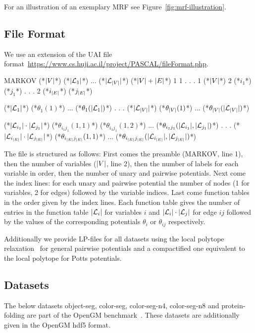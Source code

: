 For an illustration of an exemplary MRF see Figure~\ref{fig:mrf-illustration}.

\subsection{File Format}
\label{sec:mrf-file-format}
We use an extension of the UAI file format~\url{https://www.cs.huji.ac.il/project/PASCAL/fileFormat.php}.

{
\small
\begin{fileformat}
MARKOV
(*$\lvert V\rvert$*)
(*$\lvert\mathcal{L}_1\rvert$*) ... (*$\lvert\mathcal{L}_{\lvert V\rvert}\rvert$*) 
(*$\lvert V\rvert + \lvert E\rvert$*)
1 1
.
.
.
1 (*$\lvert V\rvert$*) 
2 (*$i_1$*) (*$j_1$*) 
.
.
.
2 (*$i_{\lvert E\rvert}$*) (*$j_{\lvert E\rvert}$*) 

(*$\lvert\mathcal{L}_1\rvert$*) 
(*$\theta_1(1)$*) ... (*$\theta_1(\lvert\mathcal{L}_1\rvert)$*)
.
.
.
(*$\lvert\mathcal{L}_{\lvert V\rvert}\rvert$*)
(*$\theta_{\lvert V\rvert}(1)$*) ... (*$\theta_{\lvert V\rvert}(\lvert\mathcal{L}_{\lvert V\rvert}\rvert)$*)

(*$\lvert\mathcal{L}_{i_1}\rvert \cdot \lvert\mathcal{L}_{j_1}\rvert $*) 
(*$\theta_{i_1 j_1}(1,1)$*) (*$\theta_{i_1 j_1}(1,2)$*) ... (*$\theta_{i_1 j_1}(\lvert\mathcal{L}_{i_1}\rvert, \lvert\mathcal{L}_{j_1}\rvert)$*)
.
.
.
(*$\lvert\mathcal{L}_{i_{\lvert E\rvert}}\rvert \cdot \lvert\mathcal{L}_{j_{\lvert E\rvert}}\rvert $*) 
(*$\theta_{i_{\lvert E\rvert} j_{\lvert E\rvert}}(1,1)$*) ... (*$\theta_{i_{\lvert E\rvert} j_{\lvert E\rvert}}(\lvert\mathcal{L}_{i_{\lvert E\rvert}}\rvert, \lvert\mathcal{L}_{j_{\lvert E\rvert}}\rvert)$*)
\end{fileformat}
}
The file is structured as follows:
First comes the preamble (MARKOV, line 1),
then the number of variables ($\lvert V\rvert$, line 2),
then the number of labels for each variable in order,
then the number of unary and pairwise potentials.
Next come the index lines:
for each unary and pairwise potential the number of nodes (1 for variables, 2 for edges) followed by the variable indices.
Last come function tables in the order given by the index lines.
Each function table gives the number of entries in the function table $\lvert\mathcal{L}_i\rvert$ for variables $i$ and $\lvert\mathcal{L}_i\rvert \cdot \lvert\mathcal{L}_j\rvert$ for edge $ij$ followed by the values of the corresponding potentials $\theta_i$ or $\theta_{ij}$ respectively.

Additionally we provide LP-files for all datasets using the local polytope relaxation~\cite{werner2007linear} for general pairwise potentials and a compactified one equivalent to the local polytope for Potts potentials.

\subsection{Datasets}
The below datasets object-seg, color-seg, color-seg-n4, color-seg-n8 and protein-folding are part of the OpenGM benchmark~\cite{kappes2015comparative}.
These datasets are additionally given in the OpenGM hdf5 format.

